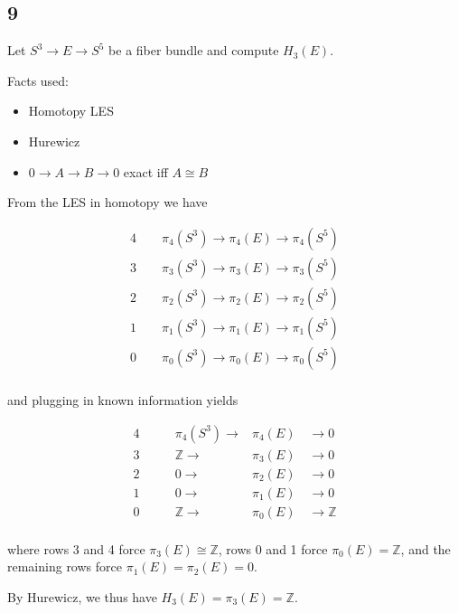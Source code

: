 \hypertarget{section-13}{%
\subsection{9}\label{section-13}}

Let \(S^3 \to E \to S^5\) be a fiber bundle and compute \(H_3(E)\).

\begin{solution}

Facts used:

\begin{itemize}
\tightlist
\item
  Homotopy LES
\item
  Hurewicz
\item
  \(0\to A\to B \to 0\) exact iff \(A\cong B\)
\end{itemize}

From the LES in homotopy we have

\begin{align} 4\qquad \pi_4(S^3) \to \pi_4(E) \to \pi_4(S^5) \\ 3\qquad \pi_3(S^3) \to \pi_3(E) \to \pi_3(S^5) \\ 2\qquad \pi_2(S^3) \to \pi_2(E) \to \pi_2(S^5) \\ 1\qquad \pi_1(S^3) \to \pi_1(E) \to \pi_1(S^5) \\ 0\qquad \pi_0(S^3) \to \pi_0(E) \to \pi_0(S^5) \\ \end{align}

and plugging in known information yields

\begin{align} 4\qquad &\pi_4(S^3) \to &\pi_4(E) \quad \to 0 \\ 3\qquad &{\mathbb{Z}}\to &\pi_3(E) \quad\to 0 \\ 2\qquad &0 \to &\pi_2(E) \quad\to 0 \\ 1\qquad &0 \to &\pi_1(E) \quad\to 0 \\ 0\qquad &{\mathbb{Z}}\to &\pi_0(E) \quad\to {\mathbb{Z}}\\ \end{align}

where rows 3 and 4 force \(\pi_3(E) \cong {\mathbb{Z}}\), rows 0 and 1
force \(\pi_0(E) = {\mathbb{Z}}\), and the remaining rows force
\(\pi_1(E) = \pi_2(E) = 0\).

By Hurewicz, we thus have \(H_3(E) = \pi_3(E) = {\mathbb{Z}}\).

\end{solution}

